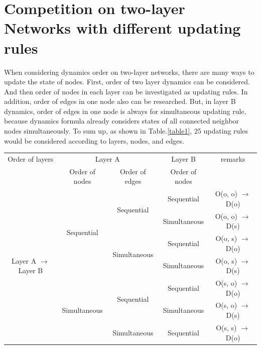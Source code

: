 \section{Competition on two-layer Networks with different updating rules}
When considering dynamics order on two-layer networks, there are many ways to update the state of nodes. First, order of two layer dynamics can be considered. And then order of nodes in each layer can be investigated as updating rules. In addition, order of edges in one node also can be researched. But, in layer B dynamics, order of edges in one node is always for simultaneous updating rule, because dynamics formula already considers states of all connected neighbor nodes simultaneously. To sum up, as shown in Table.\ref{table1}, 25 updating rules would be considered according to layers, nodes, and edges. 
\begin{table}[htp]
	\scriptsize
	\begin{center}
		\begin{tabular}{c|c|c|c|c}
			Order of layers                                  & \multicolumn{2}{|c|}{Layer A}                                      & Layer B                & remarks   \\ \cline{2-4}
			& Order of nodes                 & Order of edges                     & Order of nodes         &  \\ \hline
			\multirow{10}{*}{Layer A $\rightarrow$ Layer B} & \multirow{4}{*}{Sequential}    & \multirow{2}{*}{Sequential}        & Sequential             & O(o, o) $\to$ D(o) \\  \cline{4-5}  
			&                                &                                    & Simultaneous           & O(o, o) $\to$ D(s) \\  \cline{3-5}     
			&                                & \multirow{2}{*}{Simultaneous}      & Sequential             & O(o, s) $\to$ D(o) \\  \cline{4-5} 
			&                                &                                    & Simultaneous           & O(o, s) $\to$ D(s) \\  \cline{2-5} 
			& \multirow{4}{*}{Simultaneous}  & \multirow{2}{*}{Sequential}        & Sequential             & O(s, o) $\to$ D(o) \\  \cline{4-5}
			&                                &                                    & Simultaneous           & O(s, o) $\to$ D(s) \\  \cline{3-5}
			&                                & \multirow{2}{*}{Simultaneous}      & Sequential             & O(s, s) $\to$ D(o) \\  \cline{4-5}

\end{tabular}
\end{center}
\end{table}
